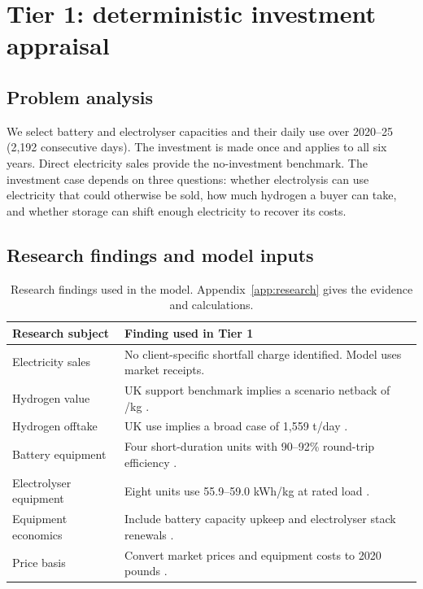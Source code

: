 \chapter{Tier 1: deterministic investment appraisal}\label{chap:tier1}
\section{Problem analysis}\label{sec:problem1}
We select battery and electrolyser capacities and their daily use over
2020--25 (2,192 consecutive days). The investment is made once and applies
to all six years. Direct electricity sales provide the no-investment
benchmark. The investment case depends on three questions: whether
electrolysis can use electricity that could otherwise be sold, how much
hydrogen a buyer can take, and whether storage can shift enough electricity
to recover its costs.

\section{Research findings and model inputs}\label{sec:research1}
\begin{table}[H]
\centering\small
\caption{Research findings used in the model. Appendix~\ref{app:research} gives the evidence and calculations.}
\label{tab:findings}
\begin{tabularx}{\linewidth}{@{}lY@{}}
\toprule
Research subject & Finding used in Tier 1 \\
\midrule
Electricity sales & No client-specific shortfall charge identified. Model uses market receipts. \\
Hydrogen value & UK support benchmark implies a scenario netback of /kg \cite{har}. \\
Hydrogen offtake & UK use implies a broad case of 1,559 t/day \cite{eho}. \\
Battery equipment & Four short-duration units with 90--92\% round-trip efficiency \cite{v6}. \\
Electrolyser equipment & Eight units use 55.9--59.0 kWh/kg at rated load \cite{v6}. \\
Equipment economics & Include battery capacity upkeep and electrolyser stack renewals \cite{beis,v6}. \\
Price basis & Convert market prices and equipment costs to 2020 pounds \cite{cpi,basis}. \\
\bottomrule
\end{tabularx}
\end{table}



